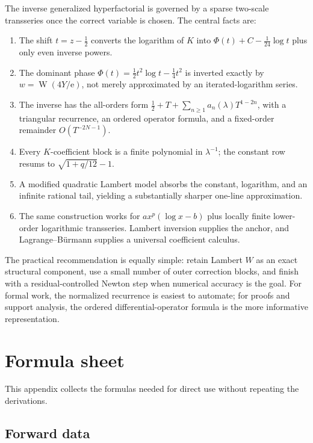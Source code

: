 \documentclass[11pt,oneside]{article}
\theoremstyle{plain}
\theoremstyle{definition}
\theoremstyle{remark}
\newcommand{\W}{\operatorname{W}}
\newcommand{\e}{\mathrm{e}}
\begin{document}
The inverse generalized hyperfactorial is governed by a sparse two-scale
transseries once the correct variable is chosen.  The central facts are:
\begin{enumerate}
 \item The shift \(t=z-\tfrac12\) converts the logarithm of \(K\) into
       \(\Phi(t)+C-\tfrac1{24}\log t\) plus only even inverse powers.
 \item The dominant phase \(\Phi(t)=\tfrac12t^2\log t-\tfrac14t^2\) is
       inverted exactly by \(w=\W(4Y/\e)\), not merely approximated by an
       iterated-logarithm series.
 \item The inverse has the all-orders form
       \(\tfrac12+T+\sum_{n\ge1}a_n(\lambda)T^{1-2n}\), with a triangular
       recurrence, an ordered operator formula, and a fixed-order remainder
       \(O(T^{-2N-1})\).
 \item Every \(K\)-coefficient block is a finite polynomial in
       \(\lambda^{-1}\); the constant row resums to
       \(\sqrt{1+q/12}-1\).
 \item A modified quadratic Lambert model absorbs the constant, logarithm,
       and an infinite rational tail, yielding a substantially sharper
       one-line approximation.
 \item The same construction works for
       \(a x^p(\log x-b)\) plus locally finite lower-order logarithmic
       transseries.  Lambert inversion supplies the anchor, and
       Lagrange--B\"urmann supplies a universal coefficient calculus.
\end{enumerate}

The practical recommendation is equally simple: retain Lambert \(W\) as an
exact structural component, use a small number of outer correction blocks, and
finish with a residual-controlled Newton step when numerical accuracy is the
goal.  For formal work, the normalized recurrence is easiest to automate; for
proofs and support analysis, the ordered differential-operator formula is the
more informative representation.

\appendix

\section{Formula sheet}
\label{app:formula-sheet}

This appendix collects the formulas needed for direct use without repeating
the derivations.

\subsection{Forward data}
\end{document}
